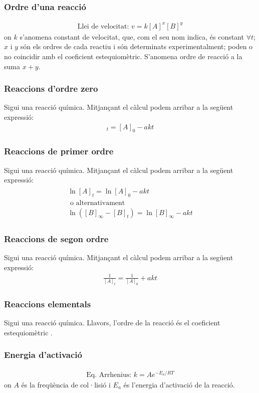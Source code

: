 \subsubsection*{Ordre d'una reacció}
\begin{align}
    \text{Llei de velocitat: } v = k [A]^{x} [B]^{y}
\end{align}
on $k$ s'anomena constant de velocitat, que, com el seu nom indica, és constant $\forall t$; $x$ i $y$ són els ordres de cada reactiu i són determinats experimentalment; poden o no coincidir amb el coeficient estequiomètric. S'anomena ordre de reacció a la suma $x + y$.
\subsubsection*{Reaccions d'ordre zero}
Sigui  una reacció química. Mitjan\c{c}ant el càlcul podem arribar a la següent expressió:
\begin{align}
    [A]_{t} = [A]_{0} - akt
\end{align}
\subsubsection*{Reaccions de primer ordre}
Sigui  una reacció química. Mitjan\c{c}ant el càlcul podem arribar a la següent expressió:
\begin{align}
\begin{gathered}
    \ln [A]_{t} = \ln [A]_{0} -akt \\
    \text{ o alternativament } \\
    \ln ([B]_{\infty} - [B]_{t}) = \ln [B]_{\infty} -akt 
\end{gathered}
\end{align}
\subsubsection*{Reaccions de segon ordre}
Sigui  una reacció química. Mitjan\c{c}ant el càlcul podem arribar a la següent expressió:
\begin{align}
    \frac{1}{[A]_{t}} = \frac{1}{[A]_{0}} + akt 
\end{align}
\subsubsection*{Reaccions elementals}
Sigui  una reacció química. Llavors, l'ordre de la reacció és el coeficient estequiomètric .
\subsubsection*{Energia d'activació}
\begin{align}
    \text{Eq. Arrhenius: } k = A e^{-E_{a}/RT}
\end{align}
on $A$ és la freqüència de col·lisió i $E_{a}$ és l'energia d'activació de la reacció.
